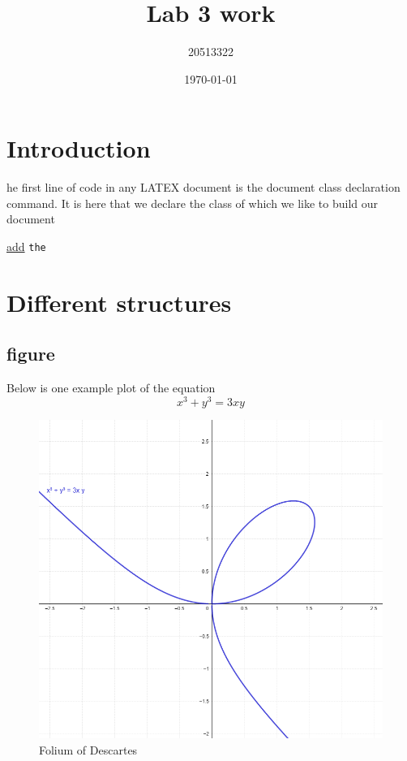 \documentclass{article}
\title{Lab 3 work}
\author{20513322}
\date{\today}
\begin{document}
\maketitle
\tableofcontents
\newpage
\section{Introduction}
\begin{multicols}{2}
he first line of code in any LATEX document is the document class declaration command. It is here that we declare the class of which we like to build our document
\end{multicols}
\underline{add}
\texttt{the}
\section{Different structures}
\subsection{figure}
Below is one example plot of the equation
\begin{equation}
x^3+y^3=3xy
\end{equation}
\begin{figure}[h]
\centering
\includegraphics[scale=0.1]{eqnfig}
\caption{Folium of Descartes}
\label{1}
\end{figure}
\end{document}
